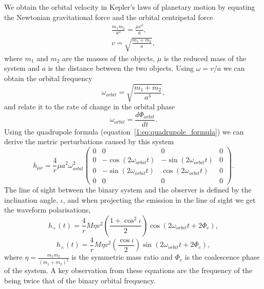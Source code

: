 We obtain the orbital velocity in Kepler's laws of planetary motion by equating the Newtonian gravitational force and the orbital centripetal force
%
\begin{align}
    \frac{m_{1} m_{2}}{a^{2}} = \frac{\mu v^{2}}{a}, \\
    v = \sqrt{\frac{m_{1} + m_{2}}{a}},
\end{align}
%
where $m_{1}$ and $m_{2}$ are the masses of the objects, $\mu$ is the reduced mass of the system and $a$ is the distance between the two objects.
%
Using $\omega = v/a$ we can obtain the orbital frequency
%
\begin{equation}
    \omega_{orbit} = \sqrt{\frac{m_{1} + m_{2}}{a^{3}}},
    \label{1:eq:omega_orbit}
\end{equation}
%
and relate it to the rate of change in the orbital phase
%
\begin{equation}
    \omega_{orbit} = \frac{d \Phi_{orbit}}{dt}.
\end{equation}
%
Using the quadrupole formula (equation~\ref{1:eq:quadrupole_formula}) we can derive the metric perturbations caused by this system
%
\begin{equation}
    h_{\mu\nu} = \frac{4}{r} \mu a^{2} \omega^{2}_{orbit}
    \begin{pmatrix}
      0 & 0 & 0 & 0 \\
      0 & -\cos\left(2\omega_{orbit}t\right) & -\sin\left(2\omega_{orbit}t\right) & 0 \\
      0 & -\sin\left(2\omega_{orbit}t\right) & \cos\left(2\omega_{orbit}t\right) & 0 \\
      0 & 0 & 0 & 0
   \end{pmatrix}.
\end{equation}
%
The line of sight between the binary system and the observer is defined by the inclination angle, $\iota$, and when projecting the \gwadj emission in the line of sight we get the waveform polarisations,
%
\begin{equation}
    h_{+}(t) = \frac{4}{r} M\eta v^{2} \left(\frac{1 + \cos^{2}\iota}{2}\right)\cos\left(2\omega_{orbit}t+2\Phi_{c}\right),
\end{equation}
%
\begin{equation}
    h_{\times}(t) = \frac{4}{r} M\eta v^{2} \left(\frac{\cos\iota}{2}\right)\sin\left(2\omega_{orbit}t+2\Phi_{c}\right),
\end{equation}
%
where $\eta = \frac{m_{1}m_{2}}{(m_{1} + m_{2})^{2}}$ is the symmetric mass ratio and $\Phi_{c}$ is the coalescence phase of the system. A key observation from these equations are the frequency of the \gws being twice that of the binary orbital frequency.

